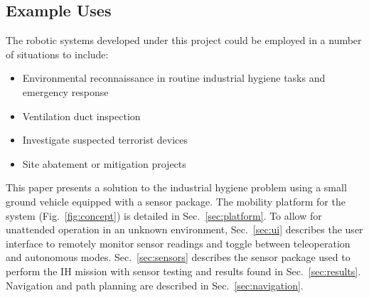 \subsection{Example Uses}
The robotic systems developed under this project could be employed in a number of situations to include:
\begin{itemize}
	\item Environmental reconnaissance in routine industrial hygiene tasks and emergency response
	\item Ventilation duct inspection
	\item Investigate suspected terrorist devices
	\item Site abatement or mitigation projects
\end{itemize}

This paper presents a solution to the industrial hygiene problem using a small ground vehicle equipped with a sensor package. The mobility platform for the system (Fig.~\ref{fig:concept}) is detailed in Sec.~\ref{sec:platform}. To allow for unattended operation in an unknown environment, Sec.~\ref{sec:ui} describes the user interface to remotely monitor sensor readings and toggle between teleoperation and autonomous modes. Sec.~\ref{sec:sensors} describes the sensor package used to perform the IH mission with sensor testing and results found in Sec.~\ref{sec:results}. Navigation and path planning are described in Sec.~\ref{sec:navigation}.
